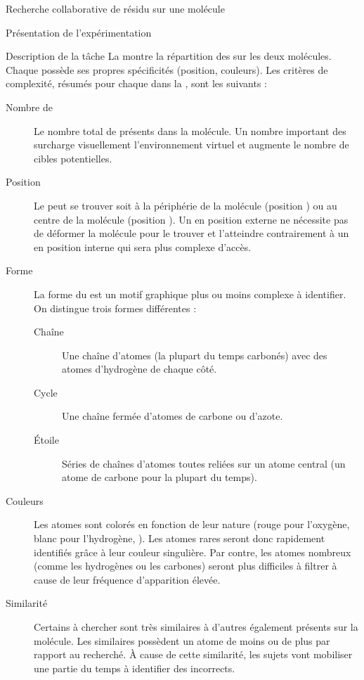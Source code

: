 \documentclass[myfrancais]{mythesis}
\begin{document}
\begin{mychapter}{Recherche collaborative de résidu sur une molécule}
\begin{mysection}{Présentation de l'expérimentation}
\begin{mysubsection}{Description de la tâche}
				La  montre la répartition des  sur les deux molécules.
				Chaque  possède ses propres spécificités (position, couleurs\myetc).
				Les critères de complexité, résumés pour chaque  dans la , sont les suivants :
				\begin{description}
					\item[Nombre de ] Le nombre total de  présents dans la molécule.
						Un nombre important des  surcharge visuellement l'environnement virtuel et augmente le nombre de cibles potentielles.
					\item[Position] Le  peut se trouver soit à la périphérie de la molécule (position ) ou au centre de la molécule (position ).
						Un  en position externe ne nécessite pas de déformer la molécule pour le trouver et l'atteindre contrairement à un  en position interne qui sera plus complexe d'accès.
					\item[Forme] La forme du  est un motif graphique plus ou moins complexe à identifier.
						On distingue trois formes différentes :
						\begin{description}
							\item[Chaîne] Une chaîne d'atomes (la plupart du temps carbonés) avec des atomes d'hydrogène de chaque côté.
							\item[Cycle] Une chaîne fermée d'atomes de carbone ou d'azote.
							\item[Étoile] Séries de chaînes d'atomes toutes reliées sur un atome central (un atome de carbone pour la plupart du temps).
						\end{description}
					\item[Couleurs] Les atomes sont colorés en fonction de leur nature (rouge pour l'oxygène, blanc pour l'hydrogène, \myetc).
						Les atomes rares seront donc rapidement identifiés grâce à leur couleur singulière.
						Par contre, les atomes nombreux (comme les hydrogènes ou les carbones) seront plus difficiles à filtrer à cause de leur fréquence d'apparition élevée.
					\item[Similarité] Certains  à chercher sont très similaires à d'autres  également présents sur la molécule.
						Les  similaires possèdent un atome de moins ou de plus par rapport au  recherché.
						À cause de cette similarité, les sujets vont mobiliser une partie du temps à identifier des  incorrects.
				\end{description}


\end{mysubsection}
\end{mysection}
\end{mychapter}
\end{document}
